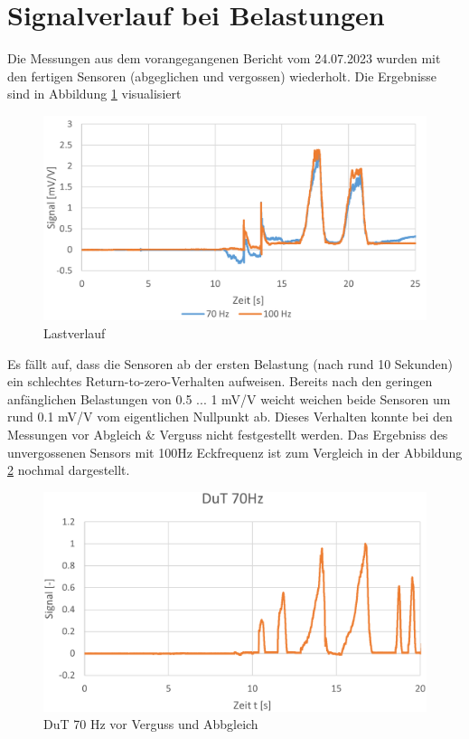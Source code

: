
\section{Signalverlauf bei Belastungen}
\noindent Die Messungen aus dem vorangegangenen Bericht vom 24.07.2023 wurden mit den fertigen Sensoren (abgeglichen und vergossen) wiederholt. Die Ergebnisse sind in Abbildung \ref{fig:vergleichlastverlauf} visualisiert
\begin{figure}[H]
	\centering
	\includegraphics[width=1\linewidth]{imgs/Vergleich_Lastverlauf}
	\caption{Lastverlauf}
	\label{fig:vergleichlastverlauf}
\end{figure}
\noindent
Es fällt auf, dass die Sensoren ab der ersten Belastung (nach rund 10 Sekunden) ein schlechtes Return-to-zero-Verhalten aufweisen. Bereits nach den geringen anfänglichen Belastungen von 0.5 ... 1 mV/V weicht weichen beide Sensoren um rund 0.1 mV/V vom eigentlichen Nullpunkt ab. Dieses Verhalten konnte bei den Messungen vor Abgleich \& Verguss nicht festgestellt werden. Das Ergebniss des unvergossenen Sensors mit 100Hz Eckfrequenz ist zum Vergleich in der Abbildung \ref{fig:dutsolounvergossen} nochmal dargestellt.
\begin{figure}[H]
	\centering
	\includegraphics[width=1\linewidth]{imgs/dut_solo_unvergossen}
	\caption{DuT 70 Hz vor Verguss und Abbgleich}
	\label{fig:dutsolounvergossen}
\end{figure}
